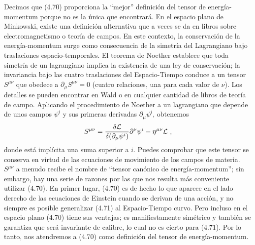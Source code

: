 \documentclass[11pt,b5paper,openany,twoside]{book}
\newcommand{\mn}{{\mu\nu}}
\newcommand{\p}[1]{{\partial_{#1}}}
\begin{document}
Decimos que (4.70) proporciona la ``mejor'' definición del tensor de energía-momentum porque no es la única que encontrará.
En el espacio plano de Minkowski, existe una definición alternativa que a veces se da en libros sobre electromagnetismo o teoría de campos.
En este contexto, la conservación de la energía-momentum surge como consecuencia de la simetría del Lagrangiano bajo traslaciones espacio-temporales.
El teorema de Noether establece que toda simetría de un lagrangiano implica la existencia de una ley de conservación; la invariancia bajo las cuatro traslaciones del Espacio-Tiempo conduce a un tensor $S^\mn$ que obedece a $\p\mu S^\mn=0$ (cuatro relaciones, una para cada valor de $\nu$).
Los detalles se pueden encontrar en Wald o en cualquier cantidad de libros de teoría de campo.
Aplicando el procedimiento de Noether a un lagrangiano que depende de unos campos $\psi^i$ y sus primeras derivadas $\p\mu\psi^i$, obtenemos
\begin{equation}
S^\mn={{\delta{\cal L}}\over{\delta(\p\mu\psi^i)}}\partial^\nu\psi^i
-\eta^\mn{\cal L}\ ,\label{4.71}
\end{equation}
donde está implícita una suma superior a $i$.
Puedes comprobar que este tensor se conserva en virtud de las ecuaciones de movimiento de los campos de materia.
$S^\mn$ a menudo recibe el nombre de ``tensor canónico de energía-momentum''; sin embargo, hay una serie de razones por las que nos resulta más conveniente utilizar (4.70).
En primer lugar, (4.70) es de hecho lo que aparece en el lado derecho de las ecuaciones de Einstein cuando se derivan de una acción, y no siempre es posible generalizar (4.71) al Espacio-Tiempo curvo.
Pero incluso en el espacio plano (4.70) tiene sus ventajas; es manifiestamente simétrico y también se garantiza que será invariante de calibre, lo cual no es cierto para (4.71).
Por lo tanto, nos atendremos a (4.70) como definición del tensor de energía-momentum.
\end{document}
